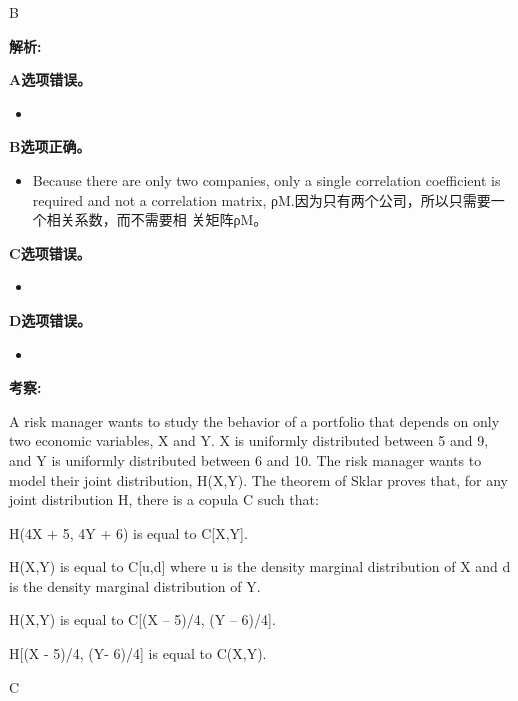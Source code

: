 \documentclass{article}
\newcounter{question} %
\newenvironment{explanation}
{\textbf{解析:}\par}
{\par}
\newcommand{\checklist}[1]{
    \textbf{考察:} #1 \par %
    \addcontentsline{toc}{subsection}{题号\thequestion 考察: #1} %
    \vspace{2em} %
}
\begin{document}
\begin{correctanswer}
    B
\end{correctanswer}

\begin{explanation}
    \textbf{A选项错误。}
    \begin{itemize}
        \item 
    \end{itemize}
    \textbf{B选项正确。}
    \begin{itemize}
        \item Because there are only two companies, only a single correlation coefficient is
        required and not a correlation matrix, ρM.因为只有两个公司，所以只需要一个相关系数，而不需要相
        关矩阵ρM。
    \end{itemize}
    \textbf{C选项错误。}
    \begin{itemize}
        \item 
    \end{itemize}
    \textbf{D选项错误。}
    \begin{itemize}
        \item 
    \end{itemize}
\end{explanation}
\checklist{}

\begin{question}
    A risk manager wants to study the behavior of a portfolio that depends on only two economic
    variables, X and Y. X is uniformly distributed between 5 and 9, and Y is uniformly distributed
    between 6 and 10. The risk manager wants to model their joint distribution, H(X,Y). The theorem
    of Sklar proves that, for any joint distribution H, there is a copula C such that:
\end{question}

\begin{choices}
    \item H(4X + 5, 4Y + 6) is equal to C[X,Y].
    \item H(X,Y) is equal to C[u,d] where u is the density marginal distribution of X and d is the
    density marginal distribution of Y.
    \item H(X,Y) is equal to C[(X – 5)/4, (Y – 6)/4].
    \item H[(X - 5)/4, (Y- 6)/4] is equal to C(X,Y).
\end{choices}

\begin{correctanswer}
    C
\end{correctanswer}
\end{document}
